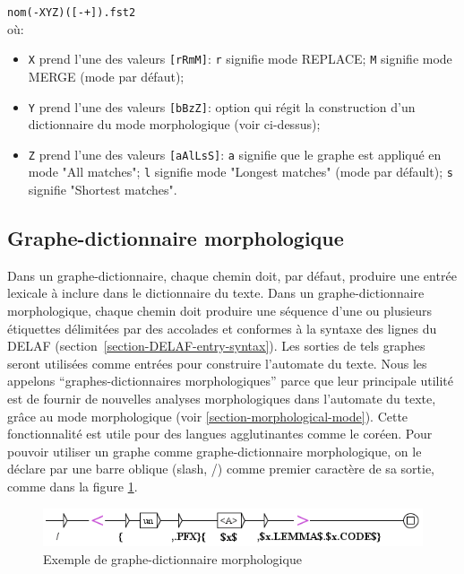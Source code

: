 \verb$nom(-XYZ)([-+]).fst2$\\

\noindent où:
\begin{itemize}
\item \verb+X+ prend l'une des valeurs \verb+[rRmM]+: \verb+r+ signifie mode REPLACE; \verb+M+
signifie mode MERGE (mode par défaut);
\item \verb+Y+ prend l'une des valeurs \verb+[bBzZ]+: option qui régit la construction d'un
dictionnaire du mode morphologique (voir ci-dessus);
\item \verb+Z+ prend l'une des valeurs \verb+[aAlLsS]+: \verb+a+ signifie que le graphe est appliqué
en mode "All matches"; \verb+l+ signifie mode "Longest matches" (mode par défault); 
\verb+s+ signifie "Shortest matches".
\end{itemize}


\subsection{Graphe-dictionnaire morphologique}
\label{section-morphological-dictionary-graphs}
Dans un graphe-dictionnaire, chaque chemin doit, par défaut, produire une entrée lexicale à inclure dans le dictionnaire du
texte. Dans un graphe-dictionnaire morphologique, chaque chemin doit produire une séquence d'une ou plusieurs
étiquettes délimitées par des accolades et conformes à la syntaxe des lignes du DELAF
 (section~\ref{section-DELAF-entry-syntax}).
Les sorties de tels graphes seront utilisées comme entrées pour construire l'automate du texte. Nous
les appelons ``graphes-dictionnaires morphologiques'' parce que leur principale utilité est de
fournir de nouvelles analyses morphologiques dans l'automate du texte, grâce au mode morphologique
(voir \ref{section-morphological-mode}). Cette fonctionnalité est utile pour des langues
agglutinantes comme le coréen.
Pour pouvoir utiliser un graphe comme graphe-dictionnaire morphologique, on le déclare
par une barre oblique (slash, /) comme premier caractère de sa sortie, comme dans la figure \ref{morphoA}.

\begin{figure}[!ht]
\begin{center}
\includegraphics[width=14cm]{resources/img/fig3-14a.png}
\caption{Exemple de graphe-dictionnaire morphologique\label{morphoA}}
\end{center}
\end{figure}

